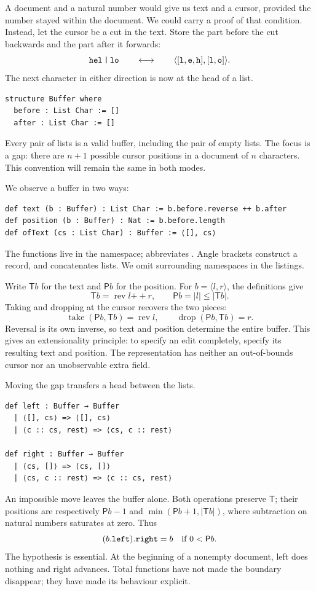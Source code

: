 \documentclass[11pt]{article}
\newcommand{\code}[1]{\texttt{\detokenize{#1}}}
\newcommand{\cat}{\mathbin{+\!+}}
\newcommand{\rev}{\operatorname{rev}}
\newcommand{\take}{\operatorname{take}}
\newcommand{\drop}{\operatorname{drop}}
\newcommand{\txt}{\mathsf{T}}
\newcommand{\pos}{\mathsf{P}}
\begin{document}
A document and a natural number would give us text and a cursor, provided the
number stayed within the document. We could carry a proof of that condition.
Instead, let the cursor be a cut in the text. Store the part before the cut
backwards and the part after it forwards:
\[
  \texttt{hel\,|\,lo}
  \qquad\longleftrightarrow\qquad
  \langle[\texttt{l},\texttt{e},\texttt{h}],
          [\texttt{l},\texttt{o}]\rangle.
\]
The next character in either direction is now at the head of a list.
\begin{lstlisting}[language=Lean]
structure Buffer where
  before : List Char := []
  after : List Char := []
\end{lstlisting}
Every pair of lists is a valid buffer, including the pair of empty lists.
The focus is a gap: there are $n+1$ possible cursor positions in a document of
$n$ characters. This convention will remain the same in both modes.

We observe a buffer in two ways:
\begin{lstlisting}[language=Lean]
def text (b : Buffer) : List Char := b.before.reverse ++ b.after
def position (b : Buffer) : Nat := b.before.length
def ofText (cs : List Char) : Buffer := ⟨[], cs⟩
\end{lstlisting}
The functions live in the \code{Buffer} namespace; \code{b.text} abbreviates
\code{Buffer.text b}. Angle brackets construct a record, and \code{++}
concatenates lists. We omit surrounding namespaces in the listings.

Write $\txt b$ for the text and $\pos b$ for the position. For
$b=\langle l,r\rangle$, the definitions give
\begin{equation}
  \txt b=\rev l\cat r,\qquad \pos b=|l|\leq|\txt b|.
  \label{eq:observations}
\end{equation}
Taking and dropping at the cursor recovers the two pieces:
\begin{equation}
  \take(\pos b,\txt b)=\rev l,
  \qquad \drop(\pos b,\txt b)=r.
  \label{eq:recover}
\end{equation}
Reversal is its own inverse, so text and position determine the entire buffer.
This gives an extensionality principle: to specify an edit completely, specify
its resulting text and position. The representation has neither an out-of-bounds
cursor nor an unobservable extra field.

Moving the gap transfers a head between the lists.
\begin{lstlisting}[language=Lean]
def left : Buffer → Buffer
  | ⟨[], cs⟩ => ⟨[], cs⟩
  | ⟨c :: cs, rest⟩ => ⟨cs, c :: rest⟩

def right : Buffer → Buffer
  | ⟨cs, []⟩ => ⟨cs, []⟩
  | ⟨cs, c :: rest⟩ => ⟨c :: cs, rest⟩
\end{lstlisting}
An impossible move leaves the buffer alone. Both operations preserve $\txt$;
their positions are respectively $\pos b-1$ and
$\min(\pos b+1,|\txt b|)$, where subtraction on natural numbers saturates at
zero. Thus
\[
  (b.\code{left}).\code{right}=b\quad\text{if }0<\pos b.
\]
The hypothesis is essential. At the beginning of a nonempty document, left
does nothing and right advances. Total functions have not made the boundary
disappear; they have made its behaviour explicit.
\end{document}
